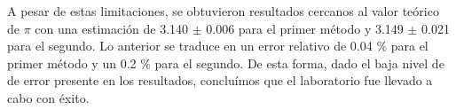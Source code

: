 \documentclass[10pt,a4paper]{article}
\begin{document}
\begin{multicols}{2}
A pesar de estas limitaciones, se obtuvieron resultados cercanos al valor teórico de $\pi$ con una estimación de 3.140 $\pm$ 0.006 para el primer método y 3.149 $\pm$ 0.021 para el segundo. Lo anterior se traduce en un error relativo de 0.04 $\%$ para el primer método y un 0.2 $\%$ para el segundo. De esta forma, dado el baja nivel de de error presente en los resultados, concluímos que el laboratorio fue llevado a cabo con éxito.





	
	
	
	\end{multicols}
\end{document}
